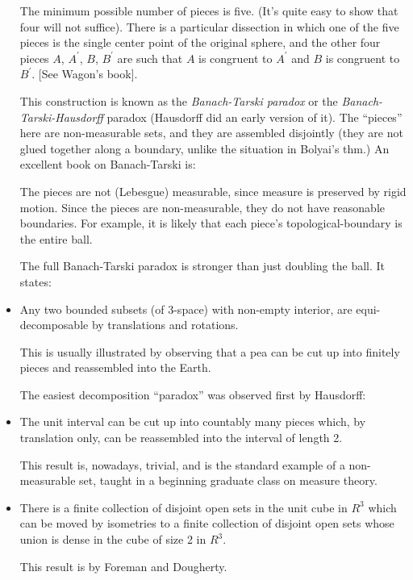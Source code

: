 \begin{itemize}
        The minimum possible number of pieces is five.  (It's quite easy
        to show that four will not suffice).  There is a particular
        dissection in which one of the five pieces is the single center
        point of the original sphere, and the other four pieces  $A$, 
       $A^\prime$, $B$, $B^\prime$  are such that $A$ is congruent to 
       $A^\prime$ and $B$ is congruent to $B^\prime$.
        [See Wagon's book].

        This construction is known as the {\em Banach-Tarski paradox} or the
        {\em Banach-Tarski-Hausdorff} paradox (Hausdorff did an early version
        of it).  The ``pieces'' here are non-measurable sets, and they are
        assembled disjointly (they are not glued together along a boundary,
        unlike the situation in Bolyai's thm.)
         An excellent book on Banach-Tarski is:





        The pieces are not (Lebesgue) measurable, since measure is preserved
        by rigid motion. Since the pieces are non-measurable, they do not
        have reasonable boundaries. For example, it is likely that each piece's
        topological-boundary is the entire ball.

        The full Banach-Tarski paradox is stronger than just doubling the
        ball.  It states:

  \item Any two bounded subsets (of $3$-space) with non-empty interior, are
        equi-decomposable by translations and rotations.

        This is usually illustrated by observing that a pea can be cut up
        into finitely pieces and reassembled into the Earth.

        The easiest decomposition ``paradox'' was observed first by Hausdorff:

    \item The unit interval can be cut up into countably many pieces which,
        by translation only, can be reassembled into the interval of
        length 2.

        This result is, nowadays, trivial, and is the standard example of a
        non-measurable set, taught in a beginning graduate class on measure
        theory.
\item \begin{teo}
 There is a finite collection of disjoint open sets in the unit cube
in $R^3$ which can be moved by isometries to a finite collection of
disjoint open sets whose union is dense in the cube of size 2 in $R^3$.
\end{teo} This result is by Foreman and Dougherty.


\end{itemize}
